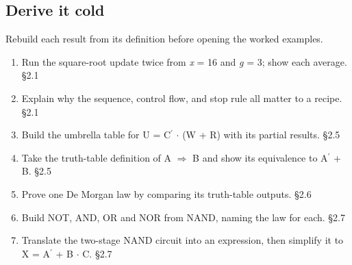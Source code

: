 \documentclass[11pt]{article}
\begin{document}
\begin{keepsection}
\section{Derive it cold}

Rebuild each result from its definition before opening the worked examples.

\begin{enumerate}
\item Run the square-root update twice from \textit{x} = 16 and \textit{g} = 3; show each average. \hfill{\small\color{FAUblue}§2.1}
\item Explain why the sequence, control flow, and stop rule all matter to a recipe. \hfill{\small\color{FAUblue}§2.1}
\item Build the umbrella table for U = C\ensuremath{{}^{\prime}} \ensuremath{\cdot} (W + R) with its partial results. \hfill{\small\color{FAUblue}§2.5}
\item Take the truth-table definition of A \ensuremath{\Rightarrow} B and show its equivalence to A\ensuremath{{}^{\prime}} + B. \hfill{\small\color{FAUblue}§2.5}
\item Prove one De Morgan law by comparing its truth-table outputs. \hfill{\small\color{FAUblue}§2.6}
\item Build NOT, AND, OR and NOR from NAND, naming the law for each. \hfill{\small\color{FAUblue}§2.7}
\item Translate the two-stage NAND circuit into an expression, then simplify it to X = A\ensuremath{{}^{\prime}} + B \ensuremath{\cdot} C. \hfill{\small\color{FAUblue}§2.7}
\end{enumerate}
\end{keepsection}
\end{document}
